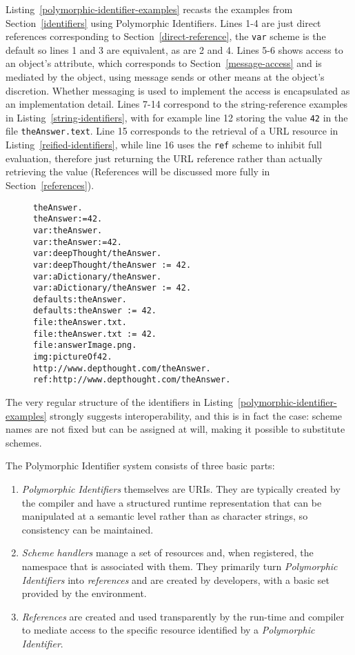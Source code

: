 \documentclass[preprint,authoryear]{llncs}
\begin{document}
Listing~\ref{polymorphic-identifier-examples} recasts the examples from Section~\ref{identifiers} using
Polymorphic Identifiers.  Lines 1-4 are just direct references corresponding to Section~\ref{direct-reference},
the {\tt var} scheme is the default so lines 1 and 3 are equivalent, as are 2 and 4.
Lines 5-6 shows access to an object's attribute, which corresponds to Section~\ref{message-access} and is
mediated by the object, using message sends or other means at the object's discretion.  Whether messaging
is used to implement the access is encapsulated as an implementation detail.  Lines 7-14 correspond
to the string-reference examples in Listing~\ref{string-identifiers}, with for example line 12 storing the
value {\tt 42} in the file {\tt theAnswer.text}.   Line 15 corresponds to the retrieval of a URL resource in Listing~\ref{reified-identifiers}, while line 16 uses the {\tt ref} scheme to inhibit full evaluation, therefore just returning the
URL reference rather than actually retrieving the value (References will be discussed more fully in Section~\ref{references}).

\begin{figure}[htbp]
\begin{lstlisting}[style=numbers,label=polymorphic-identifier-examples,caption=Some variants of Polymorphic Identifiers.]
theAnswer.
theAnswer:=42.
var:theAnswer.
var:theAnswer:=42.
var:deepThought/theAnswer.
var:deepThought/theAnswer := 42.
var:aDictionary/theAnswer.
var:aDictionary/theAnswer := 42.
defaults:theAnswer.
defaults:theAnswer := 42.
file:theAnswer.txt.
file:theAnswer.txt := 42.
file:answerImage.png.
img:pictureOf42.
http://www.depthought.com/theAnswer.
ref:http://www.depthought.com/theAnswer.
\end{lstlisting}
\end{figure}

The very regular structure of the identifiers in Listing~\ref{polymorphic-identifier-examples} strongly
suggests interoperability, and this is in fact the case:  scheme names are not fixed but can be
assigned at will, making it possible to substitute schemes.

The Polymorphic Identifier system consists of three basic parts:
\begin{enumerate}
\item \emph{Polymorphic Identifiers} themselves are URIs.  They are typically created by the 
	compiler and have a structured runtime representation that can be manipulated
	at a semantic level rather than as character strings, so consistency can be 
	maintained.
\item \emph{Scheme handlers} manage a set of resources and, when registered,
	 the namespace that is associated
	with them.  They primarily turn \emph{Polymorphic Identifiers} into \emph{references} and
	are created by developers, with a basic set provided by the environment.
\item \emph{References} are created and used transparently by the run-time and compiler
	to mediate access to the specific resource identified by a \emph{Polymorphic Identifier}.
	
	
\end{enumerate}
\end{document}
